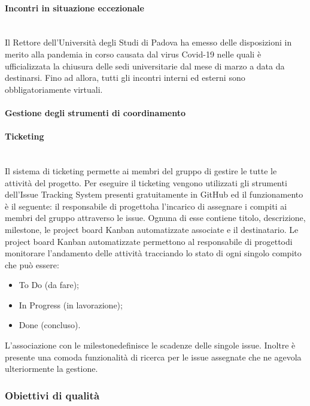 			\paragraph*{Incontri in situazione eccezionale}\mbox{}\\ [1mm]
			Il Rettore dell'Università degli Studi di Padova ha emesso delle disposizioni in merito alla pandemia in corso causata dal virus Covid-19 nelle quali è ufficializzata la chiusura delle sedi universitarie dal mese di marzo a data da destinarsi. Fino ad allora, tutti gli incontri interni ed esterni sono obbligatoriamente virtuali.
		\paragraph{Gestione degli strumenti di coordinamento}
			\paragraph*{Ticketing}\mbox{}\\ [1mm]
				Il sistema di ticketing permette ai membri del gruppo di gestire le tutte le attività del progetto\glo.
				Per eseguire il ticketing vengono utilizzati gli strumenti dell'Issue Tracking System presenti gratuitamente in GitHub ed il funzionamento è il seguente:
				il responsabile di progetto\glosp ha l'incarico di assegnare i compiti ai membri del gruppo attraverso le issue. Ognuna di esse contiene titolo, descrizione, milestone, le project board Kanban automatizzate associate e il destinatario.
				Le project board Kanban automatizzate permettono al responsabile di progetto\glosp di monitorare l'andamento delle attività tracciando lo stato di ogni singolo compito che può essere:
				\begin{itemize}
					\item To Do (da fare);
					\item In Progress (in lavorazione);
					\item Done (concluso).
				\end{itemize}
				L'associazione con le milestone\glosp definisce le scadenze delle singole issue.
				Inoltre è presente una comoda funzionalità di ricerca per le issue assegnate che ne agevola ulteriormente la gestione.
				
		\subsubsection{Obiettivi di qualità}
